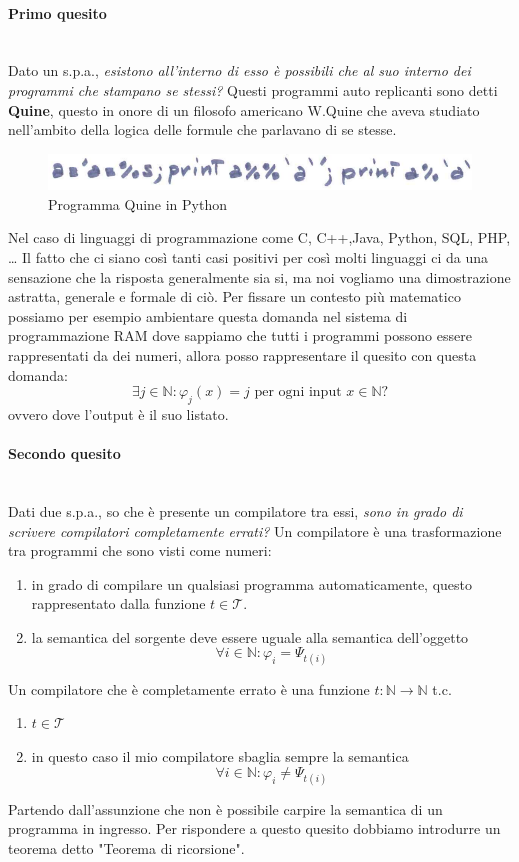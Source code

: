 \documentclass{article}
\begin{document}
\paragraph{Primo quesito}\mbox{}\\
Dato un s.p.a., \textit{esistono all'interno di esso è possibili che al suo interno dei programmi
    che stampano se stessi?} Questi programmi auto replicanti sono detti \textbf{Quine}, questo in onore
di un filosofo americano W.Quine che aveva studiato nell'ambito della logica delle formule che
parlavano di se stesse.
\begin{figure}[H]
    \centering
    \includegraphics[scale=0.35]{images/python.png}
    \caption{Programma Quine in Python}
\end{figure}
Nel caso di linguaggi di programmazione come C, C++,Java, Python, SQL, PHP, \dots
Il fatto che ci siano così tanti casi positivi per così molti linguaggi ci da una sensazione
che la risposta generalmente sia si, ma noi vogliamo una dimostrazione astratta, generale e
formale di ciò.
\newline\newline
Per fissare un contesto più matematico possiamo per esempio ambientare questa domanda nel
sistema di programmazione RAM dove sappiamo che tutti i programmi possono essere rappresentati
da dei numeri, allora posso rappresentare il quesito con questa domanda:
$$\exists j\in\mathbb{N}:\varphi_j(x)=j\text{ per ogni input }x\in\mathbb{N}?$$
ovvero dove l'output è il suo listato.

\paragraph{Secondo quesito}\mbox{}\\
Dati due s.p.a., so che è presente un compilatore tra essi, \textit{sono in grado di scrivere
    compilatori completamente errati?} Un compilatore è una trasformazione tra programmi che sono
visti come numeri:
\begin{enumerate}
    \item in grado di compilare un qualsiasi programma automaticamente, questo rappresentato
          dalla funzione $t\in\mathcal{T}$.
    \item la semantica del sorgente deve essere uguale alla semantica dell'oggetto
          $$\forall i\in\mathbb{N}:\varphi_i=\Psi_{t(i)}$$
\end{enumerate}
Un compilatore che è completamente errato è una funzione $t:\mathbb{N}\rightarrow\mathbb{N}$ t.c.
\begin{enumerate}
    \item $t\in\mathcal{T}$
    \item in questo caso il mio compilatore sbaglia sempre la semantica
          $$\forall i\in\mathbb{N}:\varphi_i\neq\Psi_{t(i)}$$
\end{enumerate}
Partendo dall'assunzione che non è possibile carpire la semantica di un programma in ingresso.
Per rispondere a questo quesito dobbiamo introdurre un teorema detto "Teorema di ricorsione".
\end{document}
